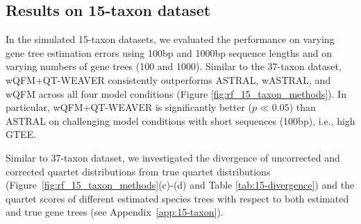 \documentclass[runningheads]{llncs}
\begin{document}

\subsection{Results on 15-taxon dataset}

In the simulated 15-taxon datasets, we evaluated the performance on varying gene tree estimation errors using 100bp and 1000bp sequence lengths and on varying numbers of gene trees (100 and 1000). Similar to the 37-taxon dataset, wQFM+QT-WEAVER consistently outperforms ASTRAL, wASTRAL, and wQFM across all four model conditions (Figure \ref{fig:rf_15_taxon_methods}). In particular, wQFM+QT-WEAVER is significantly better ($p \ll 0.05$) than ASTRAL on challenging model conditions with short sequences (100bp), i.e., high GTEE. %

Similar to 37-taxon dataset, we investigated the divergence of uncorrected and corrected quartet distributions from true quartet distributions (Figure~\ref{fig:rf_15_taxon_methods}(c)-(d) and Table \ref{tab:15-divergence}) and the quartet scores of different estimated species trees with respect to both estimated and true gene trees (see Appendix~\ref{app:15-taxon}). 



\end{document}
